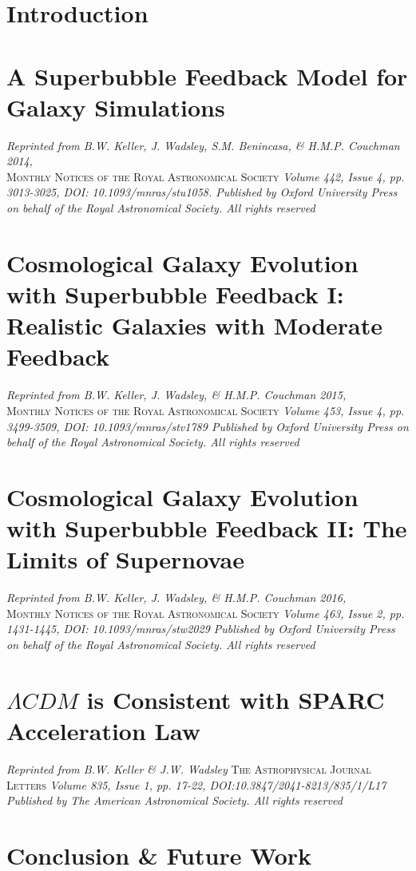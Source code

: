 \documentclass[letterpaper,12pt,twoside,openright]{report} %
\begin{document}

\chapter{Introduction}
\thispagestyle{fancy}


\chapter{A Superbubble Feedback Model for Galaxy Simulations}
\thispagestyle{fancy}
\textit{Reprinted from B.W. Keller, J. Wadsley, S.M. Benincasa, \& H.M.P.
Couchman 2014,} \\ \textsc{Monthly Notices of the Royal Astronomical Society}
\textit{Volume 442, Issue 4, pp. 3013-3025, DOI: 10.1093/mnras/stu1058.
Published by Oxford University Press on behalf of the Royal Astronomical
Society.  All rights reserved}
%
\chapter{Cosmological Galaxy Evolution with Superbubble Feedback I: Realistic
Galaxies with Moderate Feedback}
\thispagestyle{fancy}
\textit{Reprinted from B.W. Keller, J. Wadsley, \& H.M.P.
Couchman 2015,} \\ \textsc{Monthly Notices of the Royal Astronomical Society}
\textit{Volume 453, Issue 4, pp. 3499-3509, DOI: 10.1093/mnras/stv1789
Published by Oxford University Press on behalf of the Royal Astronomical
Society.  All rights reserved}
%
\chapter{Cosmological Galaxy Evolution with Superbubble Feedback II: The Limits
of Supernovae}
\thispagestyle{fancy}
\textit{Reprinted from B.W. Keller, J. Wadsley, \& H.M.P.
Couchman 2016,} \\ \textsc{Monthly Notices of the Royal Astronomical Society}
\textit{Volume 463, Issue 2, pp. 1431-1445, DOI: 10.1093/mnras/stw2029
Published by Oxford University Press on behalf of the Royal Astronomical
Society.  All rights reserved}
%
\chapter{$\Lambda CDM$ is Consistent with SPARC Acceleration Law}
\thispagestyle{fancy}
\textit{Reprinted from B.W. Keller \& J.W. Wadsley}
\textsc{The Astrophysical Journal Letters} 
\textit{Volume 835, Issue 1, pp.
17-22, DOI:10.3847/2041-8213/835/1/L17 Published by The American Astronomical
Society.  All rights reserved}
%
\chapter{Conclusion \& Future Work}
\thispagestyle{fancy}

\end{document}
